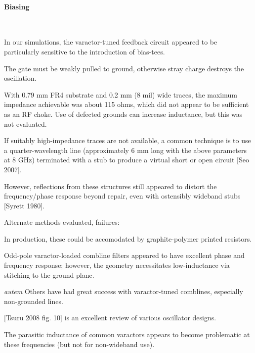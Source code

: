 \documentclass[paper.tex]{subfiles}
\begin{document}


\paragraph{Biasing}\

In our simulations, the varactor-tuned feedback circuit appeared to be particularly sensitive to the introduction of bias-tees. 


The gate must be weakly pulled to ground, otherwise stray charge destroys the oscillation.




With 0.79 mm FR4 substrate and 0.2 mm (8 mil) wide traces, the maximum impedance achievable was about 115 ohms, which did not appear to be sufficient as an RF choke. Use of defected grounds can increase inductance, but this was not evaluated.

If suitably high-impedance traces are not available, a common technique is to use a quarter-wavelength line (approximately 6 mm long with the above parameters at 8 GHz) terminated with a stub to produce a virtual short or open circuit [Seo 2007]. 

However, reflections from these structures still appeared to distort the frequency/phase response beyond repair, even with ostensibly wideband stubs [Syrett 1980].

\noindent{}

Alternate methods evaluated, failures: 


In production, these could be accomodated by graphite-polymer printed resistors. 


Odd-pole varactor-loaded combline filters appeared to have excellent phase and frequency response; however, the geometry necessitates low-inductance via stitching to the ground plane.

\begin{autem}
	{\it autem} Others have had great success with varactor-tuned comblines, especially non-grounded lines.
\end{autem}

[Tsuru 2008 fig. 10] is an excellent review of various oscillator designs.

The parasitic inductance of common varactors appears to become problematic at these frequencies (but not for non-wideband use).
\end{document}
